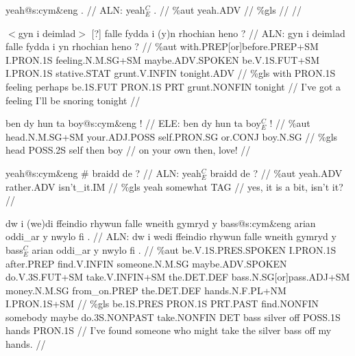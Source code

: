 \documentclass[a4paper,10pt]{article}
\begin{document}
\ex
\begingl[lingstyle=gergl]
\glchat yeah@s:cym\&eng . //
\glsurface ALN:  yeah$^{C}_{E}$ .  //
\glauto \%aut  yeah{\scriptsize .ADV}   //
\glmanual \%gls     //
\gleng  //
\endgl
\xe

\ex
\begingl[lingstyle=gergl]
\glchat $<$gyn i deimlad$>$ [?] falle fydda i (y)n rhochian heno ? //
\glsurface ALN:  gyn i deimlad falle fydda i yn rhochian heno ?  //
\glauto \%aut  with{\scriptsize .PREP[or]before.PREP+SM} I{\scriptsize .PRON.1S} feeling{\scriptsize .N.M.SG+SM} maybe{\scriptsize .ADV.SPOKEN} be{\scriptsize .V.1S.FUT+SM} I{\scriptsize .PRON.1S} stative{\scriptsize .STAT} grunt{\scriptsize .V.INFIN} tonight{\scriptsize .ADV}   //
\glmanual \%gls  with PRON{\scriptsize .1S} feeling perhaps be{\scriptsize .1S.FUT} PRON{\scriptsize .1S} PRT grunt{\scriptsize .NONFIN} tonight   //
\gleng I've got a feeling I'll be snoring tonight //
\endgl
\xe

\ex
\begingl[lingstyle=gergl]
\glchat ben dy hun ta boy@s:cym\&eng ! //
\glsurface ELE:  ben dy hun ta boy$^{C}_{E}$ !  //
\glauto \%aut  head{\scriptsize .N.M.SG+SM} your{\scriptsize .ADJ.POSS} self{\scriptsize .PRON.SG} or{\scriptsize .CONJ} boy{\scriptsize .N.SG}   //
\glmanual \%gls  head POSS{\scriptsize .2S} self then boy   //
\gleng on your own then, love! //
\endgl
\xe

\ex
\begingl[lingstyle=gergl]
\glchat yeah@s:cym\&eng \# braidd de ? //
\glsurface ALN:  yeah$^{C}_{E}$ braidd de ?  //
\glauto \%aut  yeah{\scriptsize .ADV} rather{\scriptsize .ADV} isn't\_it{\scriptsize .IM}   //
\glmanual \%gls  yeah somewhat TAG   //
\gleng yes, it is a bit, isn't it? //
\endgl
\xe

\ex
\begingl[lingstyle=gergl]
\glchat dw i (we)di ffeindio rhywun falle wneith gymryd y bass@s:cym\&eng arian oddi\_ar y nwylo fi . //
\glsurface ALN:  dw i wedi ffeindio rhywun falle wneith gymryd y bass$^{C}_{E}$ arian oddi\_ar y nwylo fi .  //
\glauto \%aut  be{\scriptsize .V.1S.PRES.SPOKEN} I{\scriptsize .PRON.1S} after{\scriptsize .PREP} find{\scriptsize .V.INFIN} someone{\scriptsize .N.M.SG} maybe{\scriptsize .ADV.SPOKEN} do{\scriptsize .V.3S.FUT+SM} take{\scriptsize .V.INFIN+SM} the{\scriptsize .DET.DEF} bass{\scriptsize .N.SG[or]pass.ADJ+SM} money{\scriptsize .N.M.SG} from\_on{\scriptsize .PREP} the{\scriptsize .DET.DEF} hands{\scriptsize .N.F.PL+NM} I{\scriptsize .PRON.1S+SM}   //
\glmanual \%gls  be{\scriptsize .1S.PRES} PRON{\scriptsize .1S} PRT{\scriptsize .PAST} find{\scriptsize .NONFIN} somebody maybe do{\scriptsize .3S.NONPAST} take{\scriptsize .NONFIN} DET bass silver off POSS{\scriptsize .1S} hands PRON{\scriptsize .1S}   //
\gleng I've found someone who might take the silver bass off my hands. //
\endgl
\xe
\end{document}
